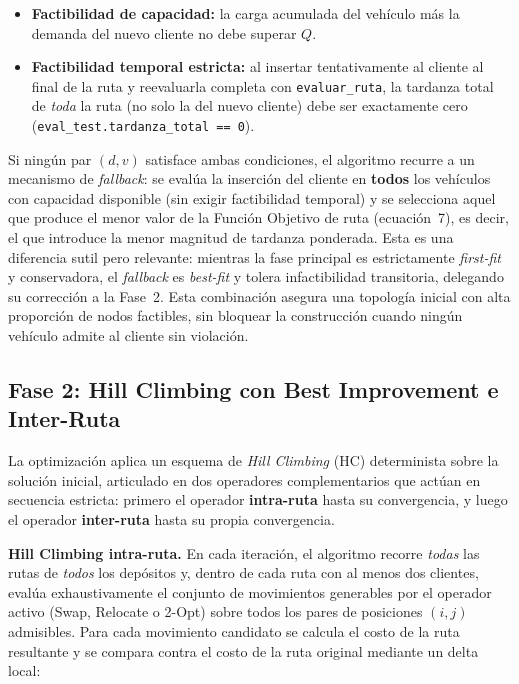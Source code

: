 \documentclass[letter, 10pt]{article}
\begin{document}
\begin{itemize}
\item \textbf{Factibilidad de capacidad:} la carga acumulada del veh\'iculo m\'as la demanda del nuevo cliente no debe superar $Q$.
\item \textbf{Factibilidad temporal estricta:} al insertar tentativamente al cliente al final de la ruta y reevaluarla completa con \texttt{evaluar\_ruta}, la tardanza total de \textit{toda} la ruta (no solo la del nuevo cliente) debe ser exactamente cero (\texttt{eval\_test.tardanza\_total == 0}).
\end{itemize}

Si ning\'un par $(d, v)$ satisface ambas condiciones, el algoritmo recurre a un mecanismo de \textit{fallback}: se eval\'ua la inserci\'on del cliente en \textbf{todos} los veh\'iculos con capacidad disponible (sin exigir factibilidad temporal) y se selecciona aquel que produce el menor valor de la Funci\'on Objetivo de ruta (ecuaci\'on~7), es decir, el que introduce la menor magnitud de tardanza ponderada. Esta es una diferencia sutil pero relevante: mientras la fase principal es estrictamente \textit{first-fit} y conservadora, el \textit{fallback} es \textit{best-fit} y tolera infactibilidad transitoria, delegando su correcci\'on a la Fase~2. Esta combinaci\'on asegura una topolog\'ia inicial con alta proporci\'on de nodos factibles, sin bloquear la construcci\'on cuando ning\'un veh\'iculo admite al cliente sin violaci\'on.

\subsection{Fase 2: Hill Climbing con Best Improvement e Inter-Ruta}

La optimizaci\'on aplica un esquema de \textit{Hill Climbing} (HC) determinista sobre la soluci\'on inicial, articulado en dos operadores complementarios que act\'uan en secuencia estricta: primero el operador \textbf{intra-ruta} hasta su convergencia, y luego el operador \textbf{inter-ruta} hasta su propia convergencia.

\textbf{Hill Climbing intra-ruta.} En cada iteraci\'on, el algoritmo recorre \textit{todas} las rutas de \textit{todos} los dep\'ositos y, dentro de cada ruta con al menos dos clientes, eval\'ua exhaustivamente el conjunto de movimientos generables por el operador activo (Swap, Relocate o 2-Opt) sobre todos los pares de posiciones $(i, j)$ admisibles. Para cada movimiento candidato se calcula el costo de la ruta resultante y se compara contra el costo de la ruta original mediante un delta local:
\end{document}
